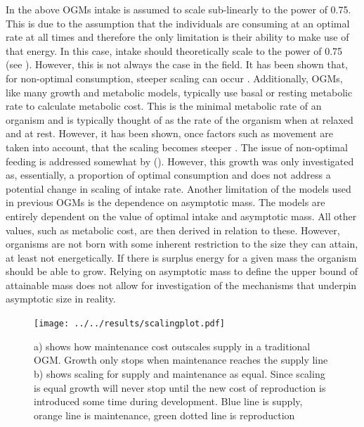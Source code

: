 \documentclass[a4paper, 11pt, hidelinks]{article} %
\begin{document}
	In the above OGMs intake is assumed to scale sub-linearly to the power of 0.75.  This is due to the assumption that the individuals are consuming at an optimal rate at all times and therefore the only limitation is their ability to make use of that energy.  In this case, intake should theoretically scale to the power of 0.75 (see \cite{West1997}).  However, this is not always the case in the field.  It has been shown that, for non-optimal consumption, steeper scaling can occur \parencite{Pawar2012, Peters1983}. Additionally, OGMs, like many growth and metabolic models, typically use basal or resting metabolic rate to calculate metabolic cost.  This is the minimal metabolic rate of an organism and is typically thought of as the rate of the organism when at relaxed and at rest.  However, it has been shown, once factors such as movement are taken into account, that the scaling becomes steeper \parencite{Weibel2004}.
	The issue of non-optimal feeding is addressed somewhat by \citeauthor{Hou2011} (\citeyear{Hou2011}).  However, this growth was only investigated as, essentially, a proportion of optimal consumption and does not address a potential change in scaling of intake rate.
	Another limitation of the models used in previous OGMs is the dependence on asymptotic mass.  The models are entirely dependent on the value of optimal intake and asymptotic mass.  All other values, such as metabolic cost, are then derived in relation to these.  However, organisms are not born with some inherent restriction to the size they can attain, at least not energetically.  If there is surplus energy for a given mass the organism should be able to grow.  Relying on asymptotic mass to define the upper bound of attainable mass does not allow for investigation of the mechanisms that underpin asymptotic size in reality. 
	
	
	\begin{figure}[h]
		\centering
		\texttt{[image: ../../results/scalingplot.pdf]}
		\caption{a) shows how maintenance cost outscales supply in a traditional OGM.  Growth only stops when maintenance reaches the supply line  b) shows scaling for supply and maintenance as equal. Since scaling is equal growth will never stop until the new cost of reproduction is introduced some time during development.  Blue line is supply, orange line is maintenance, green dotted line is reproduction}
		\label{scaling_plot}
	\end{figure}
	
\end{document}
